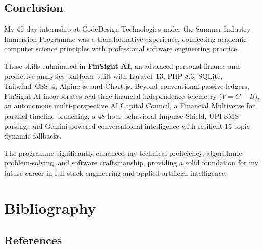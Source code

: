 \documentclass[12pt,a4paper]{report}
\newcommand{\LV}{Laravel~13}
\newcommand{\TW}{Tailwind~CSS~4}
\begin{document}
\section{Conclusion}\label{s62}

My 45-day internship at CodeDesign Technologies under the Summer Industry Immersion Programme was a transformative experience, connecting academic computer science principles with professional software engineering practice.

These skills culminated in \textbf{FinSight AI}, an advanced personal finance and predictive analytics platform built with \LV{}, PHP 8.3, SQLite, \TW{}, Alpine.js, and Chart.js. Beyond conventional passive ledgers, FinSight AI incorporates real-time financial independence telemetry ($V = C - B$), an autonomous multi-perspective AI Capital Council, a Financial Multiverse for parallel timeline branching, a 48-hour behavioral Impulse Shield, UPI SMS parsing, and Gemini-powered conversational intelligence with resilient 15-topic dynamic fallbacks.

The programme significantly enhanced my technical proficiency, algorithmic problem-solving, and software craftsmanship, providing a solid foundation for my future career in full-stack engineering and applied artificial intelligence.


\clearpage
\chapter{Bibliography}\label{refs}
\section{References}\label{s71}
\vspace{-0.5cm}
\begingroup
\raggedright
\sloppy
\setlength{\parskip}{0pt}
\end{document}
